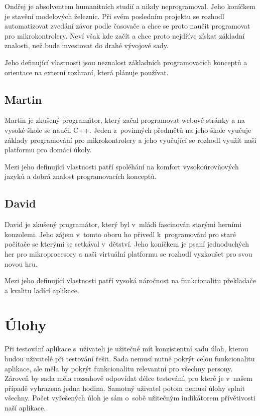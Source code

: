 Ondřej je absolventem humanitních studií a nikdy neprogramoval. Jeho koníčkem je stavění modelových železnic. Při svém posledním projektu se rozhodl automatizovat zvedání závor podle časovače a chce se proto naučit programovat pro mikrokontrolery. Neví však kde začít a chce proto nejdříve získat základní znalosti, než bude investovat do drahé vývojové sady.

Jeho definující vlastnosti jsou neznalost základních programovacích konceptů a orientace na externí rozhraní, která plánuje používat.

\subsection{Martin}
\label{persona:b}

Martin je zkušený programátor, který začal programovat webové stránky a na vysoké škole se naučil C++. Jeden z~povinných předmětů na jeho škole vyučuje základy programování pro mikrokontrolery a jeho vyučující se rozhodl využít naši platformu pro domácí úkoly.

Mezi jeho definující vlastnosti patří spoléhání na komfort vysokoúrovňových jazyků a dobrá znalost programovacích konceptů.

\subsection{David}
\label{persona:c}

David je zkušený programátor, který byl v~mládí fascinován starými herními konzolemi. Jeho zájem v~tomto oboru ho přivedl k~programování pro staré počítače se kterými se setkával v~dětství. Jeho koníčkem je psaní jednoduchých her pro mikroprocesory a naši virtuální platformu se rozhodl vyzkoušet pro svou novou hru.

Mezi jeho definující vlastnosti patří vysoká náročnost na funkcionalitu překladače a kvalitu ladící aplikace.

\section{Úlohy}

Při testování aplikace s~uživateli je užitečné mít konzistentní sadu úloh, kterou budou uživatelé při testování řešit. Sada nemusí nutně pokrýt celou funkcionalitu aplikace, ale měla by pokrýt funkcionalitu relevantní pro všechny persony. Zároveň by sada měla rozsahově odpovídat délce testování, pro které je v~našem případě vyhrazena jedna hodina. Samotný uživatel potom nemusí úlohy splnit všechny. Počet vyřešených úloh je sám o~sobě užitečným indikátorem přívětivosti naší aplikace.

